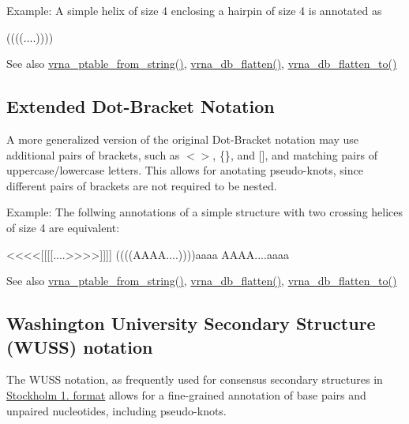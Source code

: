 Example\+: A simple helix of size 4 enclosing a hairpin of size 4 is annotated as \begin{DoxyVerb}((((....))))
\end{DoxyVerb}


\begin{DoxySeeAlso}{See also}
\hyperlink{group__struct__utils__pair__table_gac76c9ef3de507748fb0416a59323362b}{vrna\+\_\+ptable\+\_\+from\+\_\+string()}, \hyperlink{group__struct__utils__dot__bracket_gae966b9f44168a4f4b39ca42ffb5f37b7}{vrna\+\_\+db\+\_\+flatten()}, \hyperlink{group__struct__utils__dot__bracket_ga690425199c8b71545e7196e3af1436f8}{vrna\+\_\+db\+\_\+flatten\+\_\+to()}
\end{DoxySeeAlso}
\hypertarget{rna_structure_notations_dot-bracket-ext-notation}{}\subsection{Extended Dot-\/\+Bracket Notation}\label{rna_structure_notations_dot-bracket-ext-notation}
A more generalized version of the original Dot-\/\+Bracket notation may use additional pairs of brackets, such as {\ttfamily $<$$>$}, {\ttfamily \{\}}, and {\ttfamily \mbox{[}\mbox{]}}, and matching pairs of uppercase/lowercase letters. This allows for anotating pseudo-\/knots, since different pairs of brackets are not required to be nested.

Example\+: The follwing annotations of a simple structure with two crossing helices of size 4 are equivalent\+: \begin{DoxyVerb}<<<<[[[[....>>>>]]]]
((((AAAA....))))aaaa
AAAA{{{{....aaaa}}}}
\end{DoxyVerb}


\begin{DoxySeeAlso}{See also}
\hyperlink{group__struct__utils__pair__table_gac76c9ef3de507748fb0416a59323362b}{vrna\+\_\+ptable\+\_\+from\+\_\+string()}, \hyperlink{group__struct__utils__dot__bracket_gae966b9f44168a4f4b39ca42ffb5f37b7}{vrna\+\_\+db\+\_\+flatten()}, \hyperlink{group__struct__utils__dot__bracket_ga690425199c8b71545e7196e3af1436f8}{vrna\+\_\+db\+\_\+flatten\+\_\+to()}
\end{DoxySeeAlso}
\hypertarget{rna_structure_notations_wuss-notation}{}\subsection{Washington University Secondary Structure (\+W\+U\+S\+S) notation}\label{rna_structure_notations_wuss-notation}
The W\+U\+SS notation, as frequently used for consensus secondary structures in \hyperlink{file_formats_msa-formats-stockholm}{Stockholm 1. format} allows for a fine-\/grained annotation of base pairs and unpaired nucleotides, including pseudo-\/knots.

